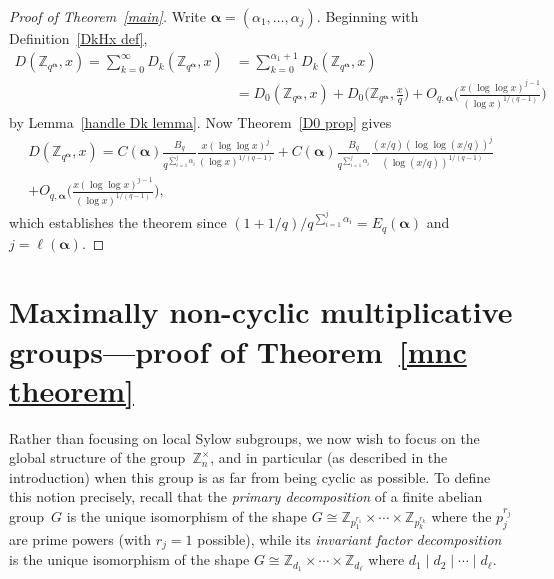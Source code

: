 \documentclass[12pt,reqno]{amsart}
\theoremstyle{definition}
\newcommand{\Z}{{\mathbb Z}}
\newcommand{\balpha}{{\bm\alpha}}
\begin{document}
\begin{proof}[Proof of Theorem~\ref{main}]
Write $\balpha=(\alpha_1,\dots,\alpha_j)$.
Beginning with Definition~\ref{DkHx def},
\begin{align*}
D(\Z_{q^\balpha},x) = \sum_{k=0}^{\infty} D_k(\Z_{q^\balpha},x) &= \sum_{k=0}^{\alpha_1+1} D_k(\Z_{q^\balpha},x) \\
&= D_0(\Z_{q^\balpha},x) + D_0\big( \Z_{q^\balpha},\tfrac xq \big) + O_{q,\balpha} \bigg( \frac{x(\log\log x)^{j-1}}{(\log x)^{1/(q-1)}} \bigg)
\end{align*}
by Lemma~\ref{handle Dk lemma}. Now Theorem~\ref{D0 prop} gives
\begin{multline*}
D(\Z_{q^\balpha},x) = C(\balpha) \frac{B_q}{q^{\sum_{i=1}^j\alpha_i}} \frac{x(\log\log x)^j}{(\log x)^{1/(q-1)}} + C(\balpha) \frac{B_q}{q^{\sum_{i=1}^j\alpha_i}} \frac{(x/q)(\log\log (x/q))^j}{(\log (x/q))^{1/(q-1)}} \\
+ O_{q,\balpha} \bigg( \frac{x(\log\log x)^{j-1}}{(\log x)^{1/(q-1)}} \bigg),
\end{multline*}
which establishes the theorem since $(1+1/q)/q^{\sum_{i=1}^j\alpha_i} = E_q(\balpha)$ and $j=\ell(\balpha)$.
\end{proof}


\section{Maximally non-cyclic multiplicative groups---proof of Theorem~\ref{mnc theorem}} \label{mnc section}

Rather than focusing on local Sylow subgroups, we now wish to focus on the global structure of the group~$\Z_n^\times$, and in particular (as described in the introduction) when this group is as far from being cyclic as possible. To define this notion precisely, recall that the {\em primary decomposition} of a finite abelian group~$G$ is the unique isomorphism of the shape $G\cong\Z_{p_1^{r_1}}\times\cdots\times\Z_{p_k^{r_k}}$ where the $p_j^{r_j}$ are prime powers (with $r_j=1$ possible), while its {\em invariant factor decomposition} is the unique isomorphism of the shape $G\cong\Z_{d_1}\times\cdots\times \Z_{d_\ell}$ where $d_1\mid d_2\mid\cdots\mid d_\ell$.
\end{document}
